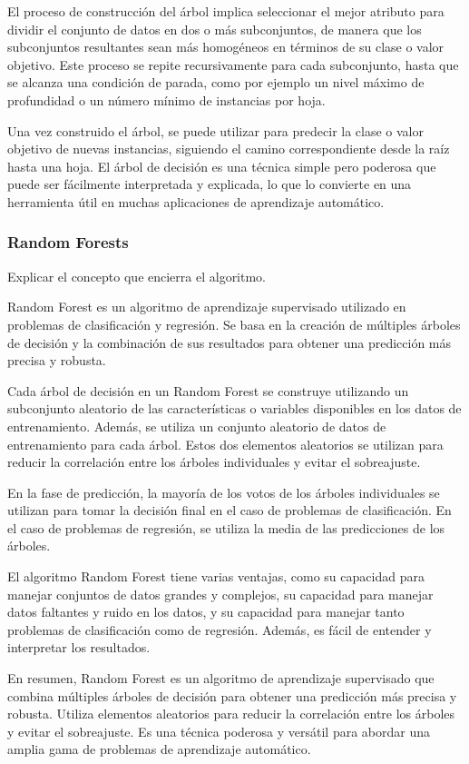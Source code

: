 \documentclass[12pt]{article}
\begin{document}
El proceso de construcción del árbol implica seleccionar el mejor atributo para dividir el conjunto de datos
en dos o más subconjuntos, de manera que los subconjuntos resultantes sean más homogéneos en términos de su clase
o valor objetivo. Este proceso se repite recursivamente para cada subconjunto, hasta que se alcanza una condición
de parada, como por ejemplo un nivel máximo de profundidad o un número mínimo de instancias por hoja.

Una vez construido el árbol, se puede utilizar para predecir la clase o valor objetivo de nuevas instancias, siguiendo
el camino correspondiente desde la raíz hasta una hoja. El árbol de decisión es una técnica simple pero poderosa
que puede ser fácilmente interpretada y explicada, lo que lo convierte en una herramienta útil en muchas aplicaciones
de aprendizaje automático.

\subsubsection*{Random Forests}

Explicar el concepto que encierra el algoritmo.

Random Forest es un algoritmo de aprendizaje supervisado utilizado en problemas de clasificación y regresión.
Se basa en la creación de múltiples árboles de decisión y la combinación de sus resultados para obtener una predicción
más precisa y robusta.

Cada árbol de decisión en un Random Forest se construye utilizando un subconjunto aleatorio de las características
o variables disponibles en los datos de entrenamiento. Además, se utiliza un conjunto aleatorio de datos
de entrenamiento para cada árbol. Estos dos elementos aleatorios se utilizan para reducir la correlación entre
los árboles individuales y evitar el sobreajuste.

En la fase de predicción, la mayoría de los votos de los árboles individuales se utilizan para tomar la decisión
final en el caso de problemas de clasificación. En el caso de problemas de regresión, se utiliza la media de las
predicciones de los árboles.

El algoritmo Random Forest tiene varias ventajas, como su capacidad para manejar conjuntos de datos grandes
y complejos, su capacidad para manejar datos faltantes y ruido en los datos, y su capacidad para manejar tanto
problemas de clasificación como de regresión. Además, es fácil de entender y interpretar los resultados.

En resumen, Random Forest es un algoritmo de aprendizaje supervisado que combina múltiples árboles de decisión
para obtener una predicción más precisa y robusta. Utiliza elementos aleatorios para reducir la correlación
entre los árboles y evitar el sobreajuste. Es una técnica poderosa y versátil para abordar una amplia gama
de problemas de aprendizaje automático.
\end{document}
